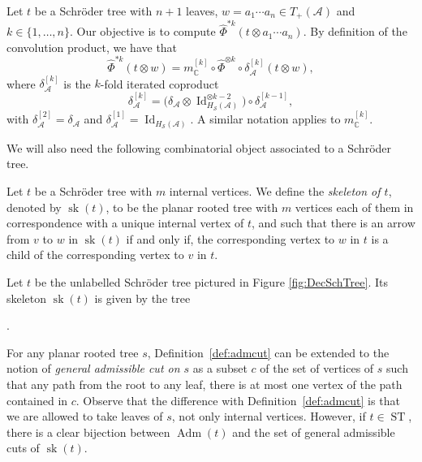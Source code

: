 \documentclass[pdftex]{sigma}%
\numberwithin{equation}{section}
\newcommand{\Id}{\operatorname{Id}}
\newcommand{\A}{\mathcal{A}}
\newcommand{\ST}{\operatorname{ST}}
\newcommand{\cHS}{H_\mathcal{S}}
\newcommand{\sk}{\operatorname{sk}}
\begin{document}
Let $t$ be a Schr\"oder tree with $n+1$ leaves, $w=a_1\cdots a_n\in T_+(\A)$ and $k \in \{1,\dots, n\}$. Our objective is to compute $\hat\Phi^{*k}(t\otimes a_1\cdots a_n)$. By definition of the convolution product, we have that
\begin{equation}
\label{eq:iterated}
	\hat\Phi^{*k}(t\otimes w) = m_{\mathbb{C}}^{[k]} \circ \hat\Phi^{\otimes k}\circ \delta_\A^{[k]}(t\otimes w),
\end{equation}
where $\delta_\A^{[k]}$ is the $k$-fold iterated coproduct
\[
	\delta_\A^{[k]} = \big(\delta_\A \otimes \Id_{\cHS(\A)}^{\otimes k-2}\big)\circ \delta_{\A}^{[k-1]},
\]
with $\delta_\A^{[2]} = \delta_\A$ and $\delta_\A^{[1]} = \Id_{\cHS(\A)}$. A similar notation applies to $m_{\mathbb{C}}^{[k]}$.

 We will also need the following combinatorial object associated to a Schr\"oder tree.

\begin{Definition}
Let $t$ be a Schr\"oder tree with $m$ internal vertices. We define the \textit{skeleton of $t$}, denoted by $\sk(t)$, to be the planar rooted tree with $m$ vertices each of them in correspondence with a unique internal vertex of $t$, and such that there is an arrow from $v$ to $w$ in $\sk(t)$ if and only if, the corresponding vertex to $w$ in $t$ is a child of the corresponding vertex to $v$ in $t$.
\end{Definition}

\begin{Example}
Let $t$ be the unlabelled Schr\"oder tree pictured in Figure \ref{fig:DecSchTree}. Its skeleton $\sk(t)$ is given by the tree
.
\end{Example}

\begin{Remark}\label{rem:generalcuts}For any planar rooted tree $s$, Definition~\ref{def:admcut} can be extended to the notion of \textit{general admissible cut on $s$} as a subset $c$ of the set of vertices of $s$ such that any path from the root to any leaf, there is at most one vertex of the path contained in $c$. Observe that the difference with Definition~\ref{def:admcut} is that we are allowed to take leaves of $s$, not only internal vertices. However, if $t\in \ST$, there is a clear bijection between $\operatorname{Adm}(t)$ and the set of general admissible cuts of $\sk(t)$.
\end{Remark}
\end{document}
